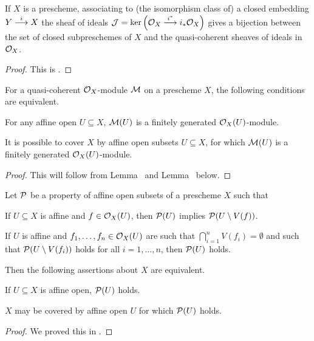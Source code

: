 \documentclass[a4paper,parskip=half,numbers=enddot, DIV=12]{scrreprt}
\begin{document}
\begin{prop}
	If $X$ is a prescheme, associating to (the isomorphism class of) a closed embedding $Y\morphism[i]X$ the sheaf of ideals $\Jj=\ker\Big(\Oo_X\morphism[i^*]i_*\Oo_X\Big)$ gives a bijection between the set of closed subpreschemes of $X$ and the quasi-coherent sheaves of ideals in $\mathcal{O}_X$.
\end{prop}
\begin{proof}
	This is \cite[Proposition~1.5.3]{alggeo1}.
\end{proof}
\begin{lem}
	For a quasi-coherent $\mathcal{O}_X$-module $\mathcal{M}$ on a prescheme $X$, the following conditions are equivalent.
	\begin{alphanumerate}
		\item For any affine open $U\subseteq X$, $\mathcal{M}(U)$ is a finitely generated $\mathcal{O}_X(U)$-module.
		\item It is possible to cover $X$ by affine open subsets $U\subseteq X$, for which $\mathcal{M}(U)$ is a finitely generated $\mathcal{O}_X(U)$-module.
	\end{alphanumerate}
\end{lem}
\begin{proof}
	This will follow from Lemma~ and Lemma~ below.
\end{proof}
\begin{lem}
	Let $\mathcal{P}$ be a property of affine open subsets of a prescheme $X$ such that
	\begin{alphanumerate}
		\item[\itememph{\alpha}] If $U\subseteq X$ is affine and $f\in\mathcal{O}_X(U)$, then $\mathcal{P}(U)$ implies $\mathcal{P}(U\setminus V(f))$.
		\item[\itememph{\beta}] If $U$ is affine and $f_1,\ldots,f_n\in\mathcal{O}_X(U)$ are such that $\bigcap_{i=1}^nV(f_i)=\emptyset$ and such that $\mathcal{P}(U\setminus V(f_i))$ holds for all $i=1,\ldots,n$, then $\mathcal{P}(U)$ holds.
	\end{alphanumerate}
	Then the following assertions about $X$ are equivalent.
	\begin{alphanumerate}
		\item If $U\subseteq X$ is affine open, $\mathcal{P}(U)$ holds.
		\item $X$ may be covered by affine open $U$ for which $\mathcal{P}(U)$ holds.
	\end{alphanumerate}
\end{lem}
\begin{proof}
	We proved this in \cite[Lemma~2.2.2]{alggeo1}.
\end{proof}
\end{document}
